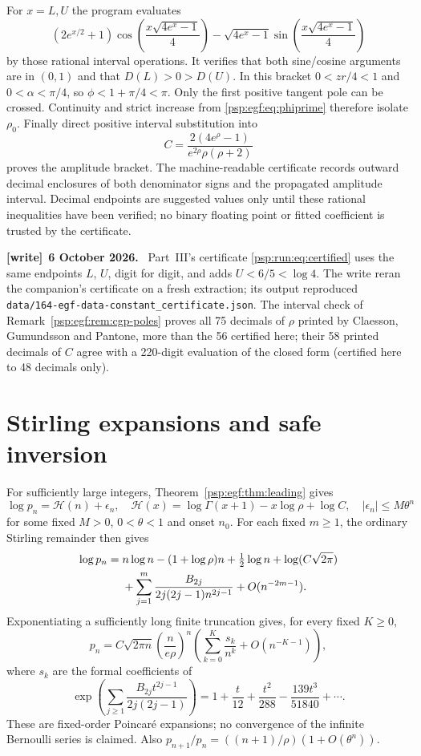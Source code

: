 \documentclass[11pt,letterpaper]{article}
\numberwithin{equation}{section}
\theoremstyle{remark}\newtheorem{remark}[theorem]{Remark}
\newcommand{\file}[1]{\nolinkurl{#1}}
\newenvironment{writenote}[1][]{\par\smallskip\begingroup\small
 \noindent\textbf{[write]}\if\relax\detokenize{#1}\relax\else~\textbf{#1.}\fi\ }%
 {\par\endgroup\smallskip}
\begin{document}
For $x=L,U$ the program evaluates
\[
 (2e^{x/2}+1)\cos\!\left(\frac{x\sqrt{4e^x-1}}4\right)
 -\sqrt{4e^x-1}\sin\!\left(\frac{x\sqrt{4e^x-1}}4\right)
\]
by those rational interval operations. It verifies that both sine/cosine
arguments are in $(0,1)$ and that $D(L)>0>D(U)$. In this bracket
$0<zr/4<1$ and $0<\alpha<\pi/4$, so $\phi<1+\pi/4<\pi$.
Only the first positive tangent pole can be crossed. Continuity and
strict increase from \eqref{psp:egf:eq:phiprime} therefore isolate $\rho_0$.
Finally direct positive interval substitution into
\[
 C=\frac{2(4e^\rho-1)}{e^{2\rho}\rho(\rho+2)}
\]
proves the amplitude bracket. The machine-readable certificate records
outward decimal enclosures of both denominator signs and the propagated
amplitude interval. Decimal endpoints are suggested values only until
these rational inequalities have been verified; no binary floating
point or fitted coefficient is trusted by the certificate.
\begin{writenote}[6 October 2026]
Part~III's certificate \eqref{psp:run:eq:certified} uses the same endpoints $L$, $U$, digit for digit, and adds $U<6/5<\log4$. The write reran the companion's certificate on a fresh extraction; its output reproduced \file{data/164-egf-data-constant_certificate.json}. The interval check of Remark~\ref{psp:egf:rem:cgp-poles} proves all 75 decimals of $\rho$ printed by Claesson, Gu\dh mundsson and Pantone, more than the 56 certified here; their 58 printed decimals of $C$ agree with a 220-digit evaluation of the closed form (certified here to 48 decimals only).
\end{writenote}

\section{Stirling expansions and safe inversion}\label{psp:egf:sec:inverse}
For sufficiently large integers, Theorem~\ref{psp:egf:thm:leading} gives
\begin{equation}\label{psp:egf:eq:logH}
 \log p_n=\mathcal H(n)+\epsilon_n,\quad
 \mathcal H(x)=\log\Gamma(x+1)-x\log\rho+\log C,\quad
 |\epsilon_n|\leq M\theta^n
\end{equation}
for some fixed $M>0$, $0<\theta<1$ and onset $n_0$.
For each fixed $m\geq1$, the ordinary Stirling remainder then gives
\begin{align}
 \log p_n={}&n\log n-(1+\log\rho)n+\tfrac12\log n
 +\log(C\sqrt{2\pi})\notag\\
 &+\sum_{j=1}^m\frac{B_{2j}}{2j(2j-1)n^{2j-1}}
 +O(n^{-2m-1}).\label{psp:egf:eq:stirling}
\end{align}
Exponentiating a sufficiently long finite truncation gives, for every
fixed $K\geq0$,
\[
 p_n=C\sqrt{2\pi n}\left(\frac n{e\rho}\right)^n
 \left(\sum_{k=0}^K\frac{s_k}{n^k}+O(n^{-K-1})\right),
\]
where $s_k$ are the formal coefficients of
\[
 \exp\left(\sum_{j\geq1}\frac{B_{2j}t^{2j-1}}{2j(2j-1)}\right)
 =1+\frac t{12}+\frac{t^2}{288}-\frac{139t^3}{51840}+\cdots.
\]
These are fixed-order Poincar\'e expansions; no convergence of the
infinite Bernoulli series is claimed. Also
$p_{n+1}/p_n=((n+1)/\rho)(1+O(\theta^n))$.
\end{document}
